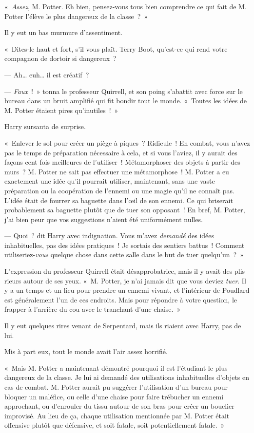 «~\emph{Assez}, M. Potter. Eh bien, pensez-vous tous bien comprendre ce qui fait de M. Potter l'élève le plus dangereux de la classe~?~»

Il y eut un bas murmure d'assentiment.

«~Dites-le haut et fort, s'il vous plaît. Terry Boot, qu'est-ce qui rend votre compagnon de dortoir si dangereux~?

--- Ah… euh… il est créatif~?

--- \emph{Faux}~!~» tonna le professeur Quirrell, et son poing s'abattit avec force sur le bureau dans un bruit amplifié qui fit bondir tout le monde. «~Toutes les idées de M. Potter étaient pires qu'inutiles~!~»

Harry sursauta de surprise.

«~Enlever le sol pour créer un piège à piques~? Ridicule~! En combat, vous n'avez pas le temps de préparation nécessaire à cela, et si vous l'aviez, il y aurait des façons cent fois meilleures de l'utiliser~! Métamorphoser des objets à partir des murs~? M. Potter ne sait pas effectuer une métamorphose~! M. Potter a eu exactement une idée qu'il pourrait utiliser, maintenant, sans une vaste préparation ou la coopération de l'ennemi ou une magie qu'il ne connaît pas. L'idée était de fourrer sa baguette dans l'œil de son ennemi. Ce qui briserait probablement sa baguette plutôt que de tuer son opposant~! En bref, M. Potter, j'ai bien peur que vos suggestions n'aient été uniformément nulles.

--- Quoi~? dit Harry avec indignation. Vous m'avez \emph{demandé} des idées inhabituelles, pas des idées pratiques~! Je sortais des sentiers battus~! Comment utiliseriez-\emph{vous} quelque chose dans cette salle dans le but de tuer quelqu'un~?~»

L'expression du professeur Quirrell était désapprobatrice, mais il y avait des plis rieurs autour de ses yeux. «~M. Potter, je n'ai jamais dit que vous deviez \emph{tuer}. Il y a un temps et un lieu pour prendre un ennemi vivant, et l'intérieur de Poudlard est généralement l'un de ces endroits. Mais pour répondre à votre question, le frapper à l'arrière du cou avec le tranchant d'une chaise.~»

Il y eut quelques rires venant de Serpentard, mais ils riaient avec Harry, pas de lui.

Mis à part eux, tout le monde avait l'air assez horrifié.

«~Mais M. Potter a maintenant démontré pourquoi il est l'étudiant le plus dangereux de la classe. Je lui ai demandé des utilisations inhabituelles d'objets en cas de combat. M. Potter aurait pu suggérer l'utilisation d'un bureau pour bloquer un maléfice, ou celle d'une chaise pour faire trébucher un ennemi approchant, ou d'enrouler du tissu autour de son bras pour créer un bouclier improvisé. Au lieu de ça, chaque utilisation mentionnée par M. Potter était offensive plutôt que défensive, et soit fatale, soit potentiellement fatale.~»

